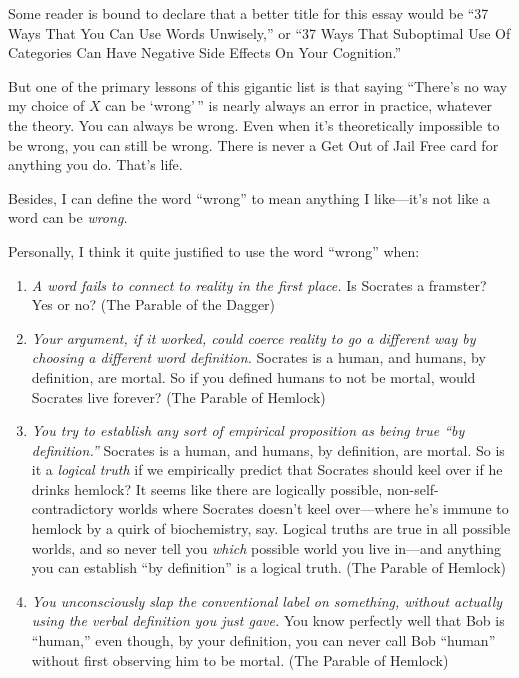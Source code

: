 { Some reader is bound to declare that a better title for this essay
would be ``37 Ways That You Can Use Words
Unwisely,'' or ``37 Ways That
Suboptimal Use Of Categories Can Have Negative Side Effects On Your
Cognition.'' 


 But one of the primary lessons of this gigantic list is that
saying ``There's no way my choice of $X$
can be `wrong'\,'' is
nearly always an error in practice, whatever the theory. You can always
be wrong. Even when it's theoretically impossible to be
wrong, you can still be wrong. There is never a Get Out of Jail Free
card for anything you do. That's life.


 Besides, I can define the word
``wrong'' to mean anything I
like---it's not like a word can be \textit{wrong.}


 Personally, I think it quite justified to use the word
``wrong'' when:

\begin{enumerate}
\item {
 \textit{A word fails to connect to reality in the first place.} Is
Socrates a framster? Yes or no? (The Parable of the Dagger)}

\item {
 \textit{Your argument, if it worked, could coerce reality to go a
different way by choosing a different word definition.} Socrates is a
human, and humans, by definition, are mortal. So if you defined humans
to not be mortal, would Socrates live forever? (The Parable of
Hemlock)}

\item {
 \textit{You try to establish any sort of empirical proposition as
being true ``by definition.''}
Socrates is a human, and humans, by definition, are mortal. So is it a
\textit{logical truth} if we empirically predict that Socrates should
keel over if he drinks hemlock? It seems like there are logically
possible, non-self-contradictory worlds where Socrates
doesn't keel over---where he's immune
to hemlock by a quirk of biochemistry, say. Logical truths are true in
all possible worlds, and so never tell you \textit{which} possible
world you live in---and anything you can establish
``by definition'' is a logical
truth. (The Parable of Hemlock)}

\item {
 \textit{You unconsciously slap the conventional label on
something, without actually using the verbal definition you just gave.}
You know perfectly well that Bob is
``human,'' even though, by your
definition, you can never call Bob
``human'' without first observing
him to be mortal. (The Parable of Hemlock)}


\end{enumerate}}
